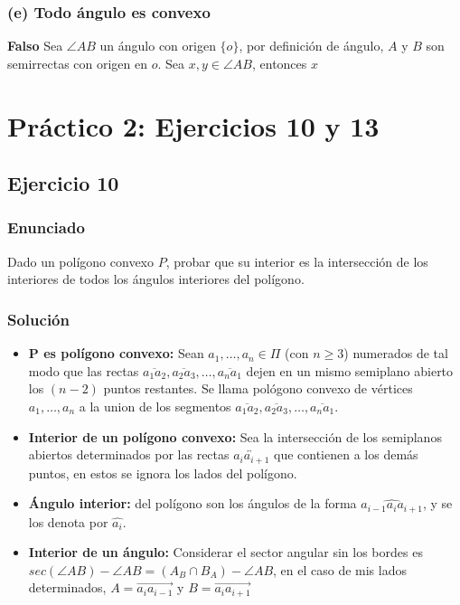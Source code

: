 \documentclass[a4paper]{article}
\begin{document}
\subsubsection{(e) Todo ángulo es convexo}
\textbf{Falso} Sea $\angle AB$ un ángulo con origen $\{o\}$, por definición de ángulo, $A$ y $B$ son semirrectas con origen en $o$. Sea $x,y \in \angle AB$, entonces $x$

\section{Práctico 2: Ejercicios 10 y 13}
\subsection{Ejercicio 10}
\subsubsection{Enunciado}
Dado un polígono convexo $P$, probar que su interior es la intersección de los interiores de todos los ángulos interiores del polígono.
\subsubsection{Solución}
\begin{itemize}
\item \textbf{P es polígono convexo:} Sean $a_1,\dots, a_n \in \Pi$ (con $n\geq 3$) numerados de tal modo que las rectas $\overline{a_1a_2}, \overline{a_2a_3}, \dots, \overline{a_na_1}$ dejen en un mismo semiplano abierto los $(n-2)$ puntos restantes. Se llama pológono convexo de vértices $a_1,\dots,a_n$ a la union de los segmentos $\overline{a_1a_2}, \overline{a_2a_3}, \dots, \overline{a_na_1}$.
\item \textbf{Interior de un polígono convexo:} Sea la intersección de los semiplanos abiertos determinados por las rectas $\overleftrightarrow{a_ia_{i+1}}$ que contienen a los demás puntos, en estos se ignora los lados del polígono.
\item \textbf{Ángulo interior:} del polígono son los ángulos de la forma $\widehat{a_{i-1}a_ia_{i+1}}$, y se los denota por $\hat{a_i}$.
\item \textbf{Interior de un ángulo:} Considerar el sector angular sin los bordes es $sec(\angle AB) - \angle AB =(A_B\cap B_A)- \angle AB$, en el caso de mis lados determinados, $A=\overrightarrow{a_ia_{i-1}}$ y $B=\overrightarrow{a_{i}a_{i+1}}$
\end{itemize}
\end{document}
